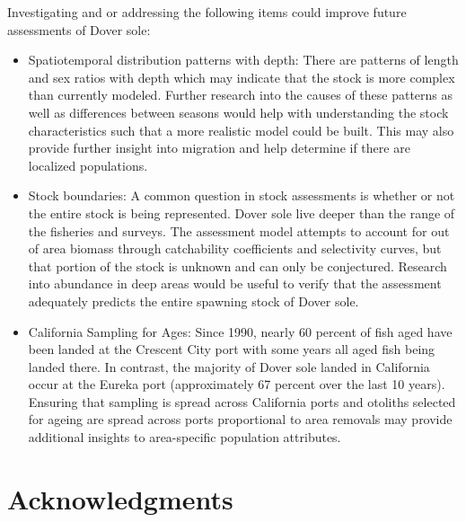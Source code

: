 \documentclass[11pt,
  english,
  a4paper,
]{article}
\begin{document}

Investigating and or addressing the following items could improve future assessments of Dover sole:

\leavevmode\tagmcend\tagstructend\par

\begin{itemize}

\item Spatiotemporal distribution patterns with depth:  There are patterns of length and sex ratios with depth which may indicate that the stock is more complex than currently modeled.  Further research into the causes of these patterns as well as differences between seasons would help with understanding the stock characteristics such that a more realistic model could be built.  This may also provide further insight into migration and help determine if there are localized populations.

\item Stock boundaries: A common question in stock assessments is whether or not the entire stock is being represented. Dover sole live deeper than the range of the fisheries and surveys.  The assessment model attempts to account for out of area biomass through catchability coefficients and selectivity curves, but that portion of the stock is unknown and can only be conjectured.  Research into abundance in deep areas would be useful to verify that the assessment adequately predicts the entire spawning stock of Dover sole.

\item California Sampling for Ages: Since 1990, nearly 60 percent of fish aged have been landed at the Crescent City port with some years all aged fish being landed there. In contrast, the majority of Dover sole landed in California occur at the Eureka port (approximately 67 percent over the last 10 years). Ensuring that sampling is spread across California ports and otoliths selected for ageing are spread across ports proportional to area removals may provide additional insights to area-specific population attributes.

\end{itemize}


\hypertarget{acknowledgments}{%
\section{Acknowledgments}\label{acknowledgments}}
\end{document}
